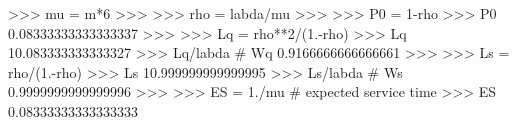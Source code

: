 
>>> mu = m*6
>>>
>>> rho = labda/mu
>>>
>>> P0 = 1-rho
>>> P0
0.08333333333333337
>>>
>>> Lq = rho**2/(1.-rho)
>>> Lq
10.083333333333327
>>> Lq/labda # Wq
0.9166666666666661
>>>
>>> Ls = rho/(1.-rho)
>>> Ls
10.999999999999995
>>> Ls/labda # Ws
0.9999999999999996
>>>
>>> ES = 1./mu # expected service time
>>> ES
0.08333333333333333

